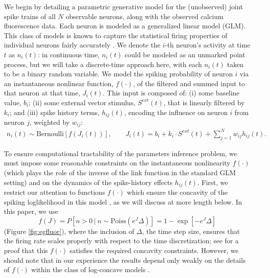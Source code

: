 \documentclass[aoas,preprint]{imsart}
\newcommand{\w}{w}
\begin{document}
We begin by detailing a parametric generative model for the (unobserved) joint spike trains of all $N$ observable neurons, along with the observed calcium fluorescence data. Each neuron is modeled as a generalized linear model (GLM). This class of models is known to capture the statistical firing properties of individual neurons fairly accurately \cite{BRIL88,CSK88,BRIL92,PG00,PILL07,PAN03d,PAN04c,Rigat06,TRUC05,NYK06,KP06,Vidne08,Stevenson2009}. We denote the $i$-th neuron's activity at time $t$ as $n_i(t)$: in continuous time, $n_i(t)$ could be modeled as an unmarked point process, but we will take a discrete-time approach here, with each $n_i(t)$ taken to be a binary random variable. We model the spiking probability of neuron $i$ via an instantaneous nonlinear function, $f(\cdot)$, of the filtered and summed input to that neuron at that time, $J_i(t)$. This input is composed of: (i) some baseline value, $b_i$; (ii) some external vector stimulus, $S^{ext}(t)$, that is linearly filtered by $k_i$; and (iii) spike history terms, $h_{ij}(t)$, encoding the influence on neuron $i$ from neuron $j$, weighted by $\w_{ij}$:
\begin{equation} \label{eqn:glm:definition}
\begin{array}{l}
n_i(t) \sim \text{Bernoulli}\left[f\left(J_i(t) \right) \right], \qquad
J_i(t)=b_i+k_i\cdot S^{ext}(t)+\sum \limits_{j=1}^{N} \w_{ij} h_{ij}(t).
\end{array}
\end{equation}

To ensure computational tractability of the parameters inference problem, we must impose some reasonable constraints on the instantaneous nonlinearity $f(\cdot)$ (which plays the role of the inverse of the link function in the standard GLM setting) and on the dynamics of the spike-history effects $h_{ij}(t)$. First, we restrict our attention to functions $f(\cdot)$ which ensure the concavity of the spiking loglikelihood in this model \cite{PAN04c,Escola07}, as we will discuss at more length below. In this paper, we use
\begin{equation}
f(J) = P\left[n>0 ~|~ n \sim \text{Poiss}\left(e^J\Delta\right)\right] = 1 - \exp[-e^J \Delta]
\end{equation}
(Figure \ref{fig:egfluor}), where the inclusion of $\Delta$, the time step size, ensures that the firing rate scales properly with respect to the time discretization; see \cite{Escola07} for a proof that this $f(\cdot)$ satisfies the required concavity constraints. However, we should note that in our experience the results depend only weakly on the details of $f(\cdot)$ within the class of log-concave models \cite{LD89,PAN04c}.
\end{document}
